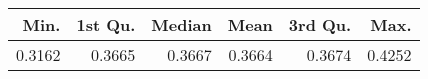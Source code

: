 \begin{table}[ht]
\centering
\begin{tabular}{rrrrrr}
  \hline
Min. & 1st Qu. & Median & Mean & 3rd Qu. & Max. \\ 
  \hline
0.3162 & 0.3665 & 0.3667 & 0.3664 & 0.3674 & 0.4252 \\ 
   \hline
\end{tabular}
\end{table}
